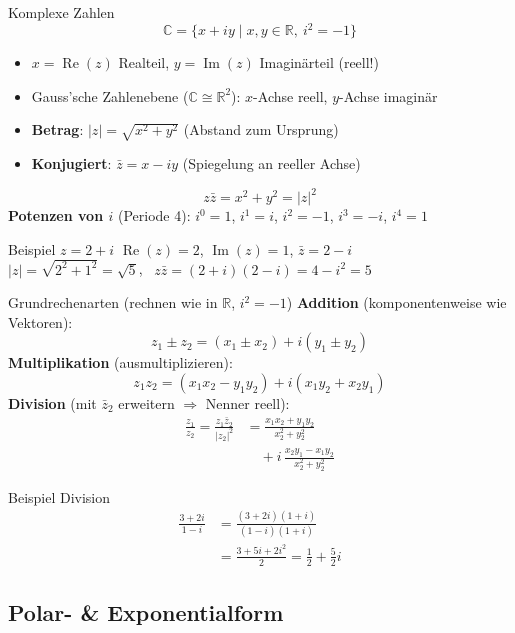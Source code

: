\documentclass[a4paper, fontsize=7pt]{scrartcl}
\def\R{\mathbb{R}}  %
\def\C{\mathbb{C}}  %
\begin{document}
\begin{mainbox}{Komplexe Zahlen}
$$\boxed{\C = \{x + iy \mid x, y \in \R,\ i^2 = -1\}}$$
\begin{itemize}
    \item $x = \operatorname{Re}(z)$ Realteil, $y = \operatorname{Im}(z)$
          Imaginärteil (reell!)
    \item Gauss'sche Zahlenebene ($\C \cong \R^2$): $x$-Achse reell,
          $y$-Achse imaginär
    \item \textbf{Betrag}: $|z| = \sqrt{x^2 + y^2}$ (Abstand zum Ursprung)
    \item \textbf{Konjugiert}: $\bar{z} = x - iy$ (Spiegelung an reeller
          Achse)
\end{itemize}
$$\boxed{z\bar{z} = x^2 + y^2 = |z|^2}$$
\textbf{Potenzen von $i$} (Periode 4): $i^0 = 1$, $i^1 = i$, $i^2 = -1$,
$i^3 = -i$, $i^4 = 1$
\end{mainbox}

\begin{subbox}{Beispiel $z = 2 + i$}
$\operatorname{Re}(z) = 2$, $\operatorname{Im}(z) = 1$, $\bar{z} = 2 - i$\\
$|z| = \sqrt{2^2 + 1^2} = \sqrt5$, \ $z\bar{z} = (2+i)(2-i) = 4 - i^2 = 5$
\end{subbox}

\begin{mainbox}{Grundrechenarten (rechnen wie in $\R$, $i^2 = -1$)}
\textbf{Addition} (komponentenweise wie Vektoren):
$$z_1 \pm z_2 = (x_1 \pm x_2) + i(y_1 \pm y_2)$$
\textbf{Multiplikation} (ausmultiplizieren):
$$z_1 z_2 = (x_1x_2 - y_1y_2) + i(x_1y_2 + x_2y_1)$$
\textbf{Division} (mit $\bar{z}_2$ erweitern $\Rightarrow$ Nenner reell):
\begin{align*}
\frac{z_1}{z_2} = \frac{z_1\bar{z}_2}{|z_2|^2}
&= \frac{x_1x_2 + y_1y_2}{x_2^2 + y_2^2}\\
&\quad + i\,\frac{x_2y_1 - x_1y_2}{x_2^2 + y_2^2}
\end{align*}
\end{mainbox}

\begin{subbox}{Beispiel Division}
\begin{align*}
\frac{3 + 2i}{1 - i} &= \frac{(3+2i)(1+i)}{(1-i)(1+i)}\\
&= \frac{3 + 5i + 2i^2}{2} = \frac12 + \frac52 i
\end{align*}
\end{subbox}

\subsection{Polar- \& Exponentialform}
\end{document}
